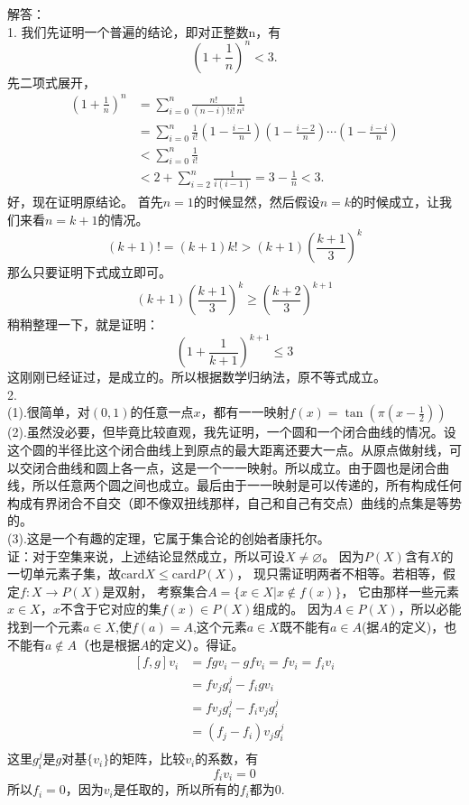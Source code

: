 \documentclass[11pt,a4paper,openany]{article}
\begin{document}
解答：\\1.
我们先证明一个普遍的结论，即对正整数n，有
\[\left(1+\frac{1}{n}\right)^n<3.\]
先二项式展开，
\[
\begin{split}
\left(1+\frac{1}{n}\right)^n
&=\sum_{i=0}^n
\frac{n!}{(n-i)!i!}\frac{1}{n^i}\\
&=\sum_{i=0}^n
\frac{1}{i!}
\left(1-\frac{i-1}{n}\right)
\left(1-\frac{i-2}{n}\right)
\cdots
\left(1-\frac{i-i}{n}\right)\\
&<\sum_{i=0}^n
\frac{1}{i!}\\
&<2+\sum_{i=2}^n
\frac{1}{i(i-1)}=3-\frac{1}{n}<3.
\end{split}
\]
好，现在证明原结论。
首先$n=1$的时候显然，然后假设$n=k$的时候成立，让我们来看$n=k+1$的情况。
\[
(k+1)!=(k+1)k!>(k+1)\left(\frac{k+1}{3}\right)^k
\]
那么只要证明下式成立即可。
\[
(k+1)\left(\frac{k+1}{3}\right)^k \geq
\left(\frac{k+2}{3}\right)^{k+1}
\]
稍稍整理一下，就是证明：
\[
\left(1+\frac{1}{k+1}\right)^{k+1}\leq 3
\]
这刚刚已经证过，是成立的。所以根据数学归纳法，原不等式成立。
\\
2.\\
(1).很简单，对$(0,1)$的任意一点$x$，都有一一映射$\displaystyle{f(x)=\tan \left(\pi\left(x-\frac{1}{2}\right)\right)}$\\
(2).虽然没必要，但毕竟比较直观，我先证明，一个圆和一个闭合曲线的情况。设这个圆的半径比这个闭合曲线上到原点的最大距离还要大一点。从原点做射线，可以交闭合曲线和圆上各一点，这是一个一一映射。所以成立。由于圆也是闭合曲线，所以任意两个圆之间也成立。最后由于一一映射是可以传递的，所有构成任何构成有界闭合不自交（即不像双扭线那样，自己和自己有交点）曲线的点集是等势的。\\
(3).这是一个有趣的定理，它属于集合论的创始者康托尔。\\
证：对于空集来说，上述结论显然成立，所以可设$X\neq\varnothing$。
因为$P(X)$含有$X$的一切单元素子集，故$\text{card}X \leq \text{card}P(X)$，
现只需证明两者不相等。若相等，假定$f:X\rightarrow P(X)$是双射，
考察集合$A=\{  x \in X|x\notin f(x) \}$，
它由那样一些元素$x\in X$，$x$不含于它对应的集$f(x)\in P(X)$组成的。
因为$A\in P(X)$，所以必能找到一个元素$a\in X$,使$f(a)=A$,这个元素$a\in X$既不能有$a\in A$(据$A$的定义)，也不能有$a\notin A$（也是根据$A$的定义）。得证。\\

\[
\begin{split}
[f,g]v_i&=fgv_i-gfv_i=fv_i=f_iv_i\\
&=fv_jg^j_i-f_igv_i\\
&=fv_jg^j_i-f_iv_jg^j_i\\
&=(f_j-f_i)v_jg^j_i\\
\end{split}
\]
这里$g^j_i$是$g$对基$\{v_i\}$的矩阵，比较$v_i$的系数，有
\[
f_iv_i=0
\]
所以$f_i=0$，因为$v_i$是任取的，所以所有的$f_i$都为0.
\end{document}
